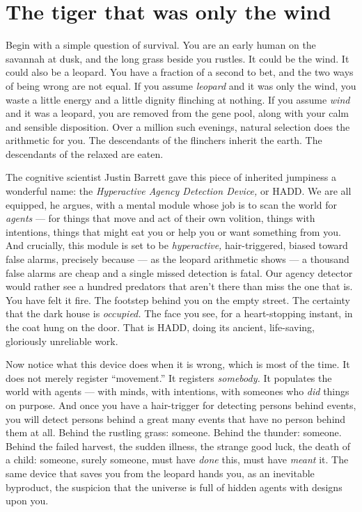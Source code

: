 \section*{The tiger that was only the wind}

Begin with a simple question of survival. You are an early human on the savannah at dusk, and the long grass beside you rustles. It could be the wind. It could also be a leopard. You have a fraction of a second to bet, and the two ways of being wrong are not equal. If you assume \emph{leopard} and it was only the wind, you waste a little energy and a little dignity flinching at nothing. If you assume \emph{wind} and it was a leopard, you are removed from the gene pool, along with your calm and sensible disposition. Over a million such evenings, natural selection does the arithmetic for you. The descendants of the flinchers inherit the earth. The descendants of the relaxed are eaten.

The cognitive scientist Justin Barrett gave this piece of inherited jumpiness a wonderful name: the \emph{Hyperactive Agency Detection Device,} or HADD. We are all equipped, he argues, with a mental module whose job is to scan the world for \emph{agents} — for things that move and act of their own volition, things with intentions, things that might eat you or help you or want something from you. And crucially, this module is set to be \emph{hyperactive,} hair-triggered, biased toward false alarms, precisely because — as the leopard arithmetic shows — a thousand false alarms are cheap and a single missed detection is fatal. Our agency detector would rather see a hundred predators that aren't there than miss the one that is. You have felt it fire. The footstep behind you on the empty street. The certainty that the dark house is \emph{occupied.} The face you see, for a heart-stopping instant, in the coat hung on the door. That is HADD, doing its ancient, life-saving, gloriously unreliable work.

Now notice what this device does when it is wrong, which is most of the time. It does not merely register ``movement.'' It registers \emph{somebody.} It populates the world with agents — with minds, with intentions, with someones who \emph{did} things on purpose. And once you have a hair-trigger for detecting persons behind events, you will detect persons behind a great many events that have no person behind them at all. Behind the rustling grass: someone. Behind the thunder: someone. Behind the failed harvest, the sudden illness, the strange good luck, the death of a child: someone, surely someone, must have \emph{done} this, must have \emph{meant} it. The same device that saves you from the leopard hands you, as an inevitable byproduct, the suspicion that the universe is full of hidden agents with designs upon you.

